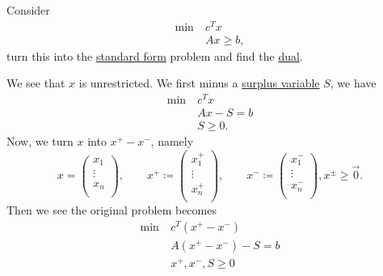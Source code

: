 \begin{eg}
	Consider
	\begin{align*}
		\min~ & c^Tx       \\
		      & Ax \geq b,
	\end{align*}
	turn this into the \hyperref[def:standard-form]{standard form} problem and find the \hyperref[def:dual]{dual}.
\end{eg}
\begin{explanation}
	We see that \(x\) is unrestricted. We first minus a \hyperref[def:surplus-variable]{surplus variable} \(S\), we have
	\begin{align*}
		\min~ & c^Tx      \\
		      & Ax - S= b \\
		      & S \geq 0.
	\end{align*}
	Now, we turn \(x\) into \(x^+ - x^-\), namely
	\[
		x = \begin{pmatrix}
			x_1    \\
			\vdots \\
			x_n    \\
		\end{pmatrix},\qquad
		x^+ \coloneqq \begin{pmatrix}
			x^+_1  \\
			\vdots \\
			x^+_n  \\
		\end{pmatrix},\qquad
		x^- \coloneqq \begin{pmatrix}
			x^-_1  \\
			\vdots \\
			x^-_n  \\
		\end{pmatrix}, x^\pm \geq \vec{0}.
	\]
	Then we see the original problem becomes
	\begin{align*}
		\min~ & c^T(x^+ - x^-)       \\
		      & A(x^+ - x^-) - S = b \\
		      & x^+, x^-, S \geq 0
	\end{align*}


\end{explanation}
